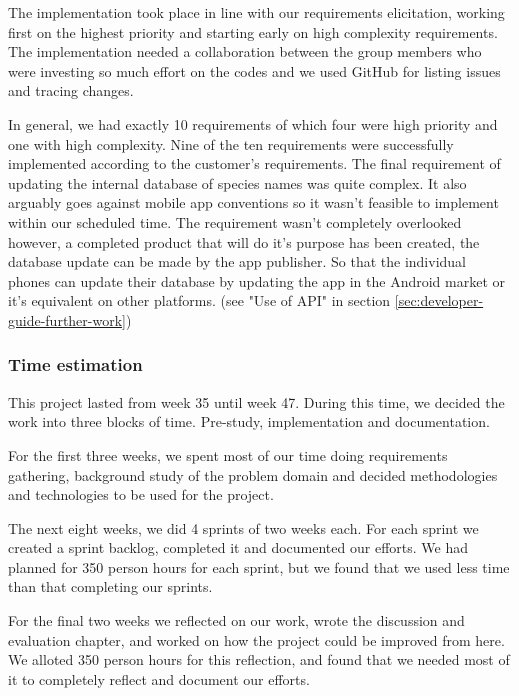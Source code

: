 The implementation took place in line with our requirements elicitation, working
first on the highest priority and starting early on high complexity
requirements.  The implementation needed a collaboration between the group
members who were investing so much effort on the codes and we used GitHub for
listing issues and tracing changes.

In general, we had exactly 10 requirements of which four were high priority and
one with high complexity.  Nine of the ten requirements were successfully
implemented according to the customer's requirements.  The final requirement of 
updating the internal database of species names was quite complex.
It also arguably goes against mobile app conventions so it wasn't feasible
to implement within our scheduled time. 
The requirement wasn't completely overlooked however, a completed product that will
do it's purpose has been created, the database update can be made by the app publisher.
So that the individual phones can update their database by updating the app in the 
Android market or it's equivalent on other platforms.
(see "Use of API" in section \ref{sec:developer-guide-further-work})

	\subsubsection{Time estimation}
  This project lasted from week 35 until week 47. During this time, we decided
  the work into three blocks of time. Pre-study, implementation and
  documentation. 
  
  For the first three weeks, we spent most of our time doing
  requirements gathering, background study of the problem domain and decided
  methodologies and technologies to be used for the project.

  The next eight weeks, we did 4 sprints of two weeks each. For each sprint we
  created a sprint backlog, completed it and documented our efforts. We had
  planned for 350 person hours for each sprint, but we found that we used less
  time than that completing our sprints. 

  For the final two weeks we reflected on our work, wrote the discussion and
  evaluation chapter, and worked on how the project could be improved from here.
  We alloted 350 person hours for this reflection, and found that we needed most
  of it to completely reflect and document our efforts. 
  
